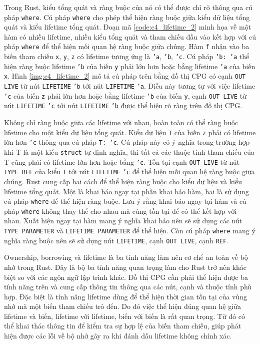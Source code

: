 Trong Rust, kiểu tổng quát và ràng buộc của nó có thể được chỉ rõ thông qua cú pháp \texttt{where}.
Cú pháp \texttt{where} cho phép thể hiện ràng buộc giữa kiểu dữ liệu tổng quát và kiểu lifetime tổng quát.
Đoạn mã \ref{code:c4_lifetime_2} minh họa về một hàm có nhiều lifetime, nhiều kiểu tổng quát và tham chiếu đầu vào kết hợp với cú pháp \texttt{where} để thể hiện mối quan hệ ràng buộc giữa chúng.
Hàm \texttt{f} nhận vào ba biến tham chiếu \texttt{x}, \texttt{y}, \texttt{z} có lifetime tương ứng là \texttt{'a}, \texttt{'b}, \texttt{'c}.
Cú pháp \texttt{'b: 'a} thể hiện ràng buộc lifetime \texttt{'b} của biến \texttt{y} phải lớn hơn hoặc bằng lifetime \texttt{'a} của biến \texttt{x}.
Hình \ref{img:c4_lifetime_2} mô tả cú pháp trên bằng đồ thị CPG có cạnh \texttt{OUT LIVE} từ nút \texttt{LIFETIME} \texttt{'b} tới nút \texttt{LIFETIME} \texttt{'a}.
Điều này tương tự với việc lifetime \texttt{'c} của biến \texttt{z} phải lớn hơn hoặc bằng lifetime \texttt{'b} của biến \texttt{y}, cạnh \texttt{OUT LIVE} từ nút \texttt{LIFETIME} \texttt{'c} tới nút \texttt{LIFETIME} \texttt{'b} được thể hiện rõ ràng trên đồ thị CPG.

Không chỉ ràng buộc giữa các lifetime với nhau, hoàn toàn có thể ràng buộc lifetime cho một kiểu dữ liệu tổng quát.
Kiểu dữ liệu \texttt{T} của biến \texttt{z} phải có lifetime lớn hơn \texttt{'c} thông qua cú pháp \texttt{T: 'c}.
Cú pháp này có ý nghĩa trong trường hợp khi T là một kiểu \texttt{struct} tự định nghĩa, thì tất cả các thuộc tính tham chiếu của T cũng phải có lifetime lớn hơn hoặc bằng \texttt{'c}.
Tồn tại cạnh \texttt{OUT LIVE} từ nút \texttt{TYPE REF} của kiểu \texttt{T} tới nút \texttt{LIFETIME} \texttt{'c} để thể hiện mối quan hệ ràng buộc giữa chúng.
Rust cung cấp hai cách để thể hiện ràng buộc cho kiểu dữ liệu và kiểu lifetime tổng quát.
Một là khai báo ngay tại phần khai báo hàm, hai là sử dụng cú pháp \texttt{where} để thể hiện ràng buộc.
Lưu ý rằng khai báo ngay tại hàm và cú pháp \texttt{where} không thay thế cho nhau mà cùng tồn tại để có thể kết hợp với nhau.
Xuất hiện ngay tại hàm mang ý nghĩa khai báo nên sẽ sử dụng các nút \texttt{TYPE PARAMETER} và \texttt{LIFETIME PARAMETER} để thể hiện.
Còn cú pháp \texttt{where} mang ý nghĩa ràng buộc nên sẽ sử dụng nút \texttt{LIFETIME}, cạnh \texttt{OUT LIVE}, cạnh \texttt{REF}.

Ownership, borrowing và lifetime là ba tính năng làm nên cơ chế an toàn về bộ nhớ trong Rust.
Đây là bộ ba tính năng quan trọng làm cho Rust trở nên khác biệt so với các ngôn ngữ lập trình khác.
Đồ thị CPG cần phải thể hiện được ba tính năng trên và cung cấp thông tin thông qua các nút, cạnh và thuộc tính phù hợp.
Đặc biệt là tính năng lifetime dùng để thể hiện thời gian tồn tại của vùng nhớ mà một biến tham chiếu trỏ đến.
Do đó việc thể hiện đúng quan hệ giữa lifetime và biến, lifetime với lifetime, biến với biến là rất quan trọng.
Từ đó có thể khai thác thông tin để kiểm tra sự hợp lệ của biến tham chiếu, giúp phát hiện được các lỗi về bộ nhớ gây ra khi đánh dấu lifetime không chính xác.
